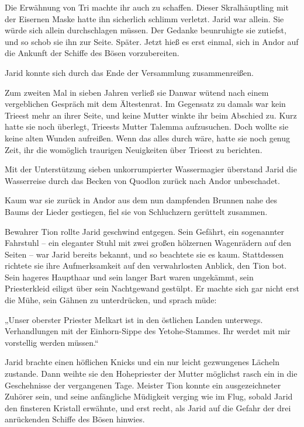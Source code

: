 Die Erwähnung von Tri machte ihr auch zu schaffen. Dieser Skralhäuptling mit der Eisernen Maske hatte ihn sicherlich schlimm verletzt. Jarid war allein. Sie würde sich allein durchschlagen müssen. Der Gedanke beunruhigte sie zutiefst, und so schob sie ihn zur Seite. Später. Jetzt hieß es erst einmal, sich in Andor auf die Ankunft der Schiffe des Bösen vorzubereiten.

Jarid konnte sich durch das Ende der Versammlung zusammenreißen.

Zum zweiten Mal in sieben Jahren verließ sie Danwar wütend nach einem vergeblichen Gespräch mit dem Ältestenrat. Im Gegensatz zu damals war kein Trieest mehr an ihrer Seite, und keine Mutter winkte ihr beim Abschied zu. Kurz hatte sie noch überlegt, Trieests Mutter Talemma aufzusuchen. Doch wollte sie keine alten Wunden aufreißen. Wenn das alles durch wäre, hatte sie noch genug Zeit, ihr die womöglich traurigen Neuigkeiten über Trieest zu berichten.

Mit der Unterstützung sieben unkorrumpierter Wassermagier überstand Jarid die Wasserreise durch das Becken von Quodlon zurück nach Andor unbeschadet.

Kaum war sie zurück in Andor aus dem nun dampfenden Brunnen nahe des Baums der Lieder gestiegen, fiel sie von Schluchzern gerüttelt zusammen.\bigskip







Bewahrer Tion rollte Jarid geschwind entgegen. Sein Gefährt, ein sogenannter Fahrstuhl – ein eleganter Stuhl mit zwei großen hölzernen Wagenrädern auf den Seiten – war Jarid bereits bekannt, und so beachtete sie es kaum. Stattdessen richtete sie ihre Aufmerksamkeit auf den verwahrlosten Anblick, den Tion bot. Sein hageres Haupthaar und sein langer Bart waren ungekämmt, sein Priesterkleid eiligst über sein Nachtgewand gestülpt. Er machte sich gar nicht erst die Mühe, sein Gähnen zu unterdrücken, und sprach müde:

„Unser oberster Priester Melkart ist in den östlichen Landen unterwegs. Verhandlungen mit der Einhorn-Sippe des Yetohe-Stammes. Ihr werdet mit mir vorstellig werden müssen.“

Jarid brachte einen höflichen Knicks und ein nur leicht gezwungenes Lächeln zustande. Dann weihte sie den Hohepriester der Mutter möglichst rasch ein in die Geschehnisse der vergangenen Tage. Meister Tion konnte ein ausgezeichneter Zuhörer sein, und seine anfängliche Müdigkeit verging wie im Flug, sobald Jarid den finsteren Kristall erwähnte, und erst recht, als Jarid auf die Gefahr der drei anrückenden Schiffe des Bösen hinwies.

